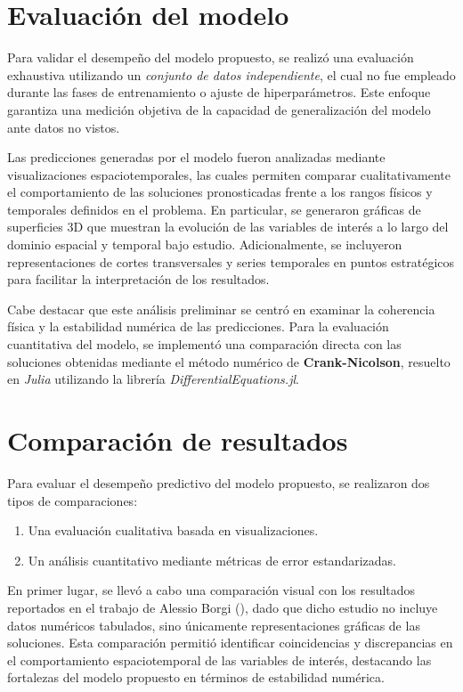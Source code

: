 \documentclass[
  spanish,
  us-letterpaper,
]{scrreprt}
\providecommand{\tightlist}{%
  \setlength{\itemsep}{0pt}\setlength{\parskip}{0pt}}
\theoremstyle{definition}
\theoremstyle{plain}
\theoremstyle{remark}
\begin{document}
\section{Evaluación del modelo}\label{evaluaciuxf3n-del-modelo}

Para validar el desempeño del modelo propuesto, se realizó una
evaluación exhaustiva utilizando un \emph{conjunto de datos
independiente}, el cual no fue empleado durante las fases de
entrenamiento o ajuste de hiperparámetros. Este enfoque garantiza una
medición objetiva de la capacidad de generalización del modelo ante
datos no vistos.

Las predicciones generadas por el modelo fueron analizadas mediante
visualizaciones espaciotemporales, las cuales permiten comparar
cualitativamente el comportamiento de las soluciones pronosticadas
frente a los rangos físicos y temporales definidos en el problema. En
particular, se generaron gráficas de superficies 3D que muestran la
evolución de las variables de interés a lo largo del dominio espacial y
temporal bajo estudio. Adicionalmente, se incluyeron representaciones de
cortes transversales y series temporales en puntos estratégicos para
facilitar la interpretación de los resultados.

Cabe destacar que este análisis preliminar se centró en examinar la
coherencia física y la estabilidad numérica de las predicciones. Para la
evaluación cuantitativa del modelo, se implementó una comparación
directa con las soluciones obtenidas mediante el método numérico de
\textbf{Crank-Nicolson}, resuelto en \emph{Julia} utilizando la librería
\emph{DifferentialEquations.jl}.

\section{Comparación de resultados}\label{comparaciuxf3n-de-resultados}

Para evaluar el desempeño predictivo del modelo propuesto, se realizaron
dos tipos de comparaciones:

\begin{enumerate}
\def\labelenumi{\arabic{enumi}.}
\tightlist
\item
  Una evaluación cualitativa basada en visualizaciones.
\item
  Un análisis cuantitativo mediante métricas de error estandarizadas.
\end{enumerate}

En primer lugar, se llevó a cabo una comparación visual con los
resultados reportados en el trabajo de Alessio Borgi
(), dado que dicho estudio no incluye
datos numéricos tabulados, sino únicamente representaciones gráficas de
las soluciones. Esta comparación permitió identificar coincidencias y
discrepancias en el comportamiento espaciotemporal de las variables de
interés, destacando las fortalezas del modelo propuesto en términos de
estabilidad numérica.
\end{document}
